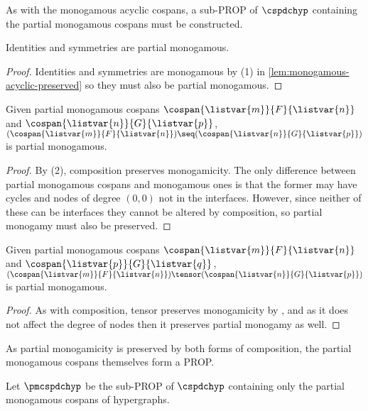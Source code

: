 As with the monogamous acyclic cospans, a sub-PROP of \(\cspdchyp\) containing
the partial monogamous cospans must be constructed.

\begin{lemma}
    Identities and symmetries are partial monogamous.
\end{lemma}
\begin{proof}
    Identities and symmetries are monogamous by (1) in
    \cref{lem:monogamous-acyclic-preserved} so they must also be partial
    monogamous.
\end{proof}

\begin{lemma}
    Given partial monogamous cospans \(\cospan{\listvar{m}}{F}{\listvar{n}}\)
    and \(\cospan{\listvar{n}}{G}{\listvar{p}}\), \(
        (\cospan{\listvar{m}}{F}{\listvar{n}})
        \seq
        (\cospan{\listvar{n}}{G}{\listvar{p}})
    \) is partial monogamous.
\end{lemma}
\begin{proof}
    By (2), composition preserves monogamicity.
    The only difference between partial monogamous cospans and monogamous ones
    is that the former may have cycles and nodes of degree \((0,0)\) not in the
    interfaces.
    However, since neither of these can be interfaces they cannot be altered by
    composition, so partial monogamy must also be preserved.
\end{proof}

\begin{lemma}
    Given partial monogamous cospans \(\cospan{\listvar{m}}{F}{\listvar{n}}\)
    and \(\cospan{\listvar{p}}{G}{\listvar{q}}\), \(
        (\cospan{\listvar{m}}{F}{\listvar{n}})
        \tensor
        (\cospan{\listvar{n}}{G}{\listvar{p}})
    \) is partial monogamous.
\end{lemma}
\begin{proof}
    As with composition, tensor preserves monogamicity by
    \cite[Lem. 17]{bonchi2022stringa}, and as it does not affect the degree of
    nodes then it preserves partial monogamy as well.
\end{proof}

As partial monogamicity is preserved by both forms of composition, the
partial monogamous cospans themselves form a PROP.

\begin{definition}
    Let \(\pmcspdchyp\) be the sub-PROP of \(\cspdchyp\) containing only the
    partial monogamous cospans of hypergraphs.
\end{definition}

